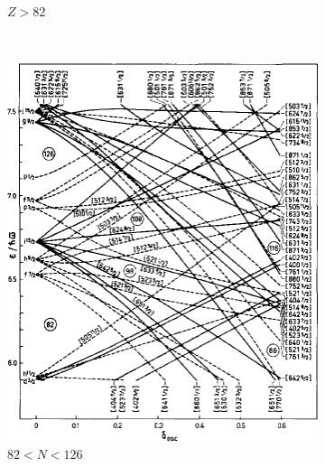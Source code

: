 \documentclass[8pt,a4paper, twoside]{report}
\begin{document}
\begin{figure}
\begin{subfigure}[b]{0.45\textwidth}
    \caption{$Z>82$}
\end{subfigure}
\\
\begin{subfigure}[b]{0.48\textwidth}
    \includegraphics[width=\textwidth]{./figures/Nilsson/neutron_deformed82.png}
    \caption{$82<N<126$}
\end{subfigure}	
\quad
\begin{subfigure}[b]{0.48\textwidth}

\end{subfigure}
\end{figure}
\end{document}

